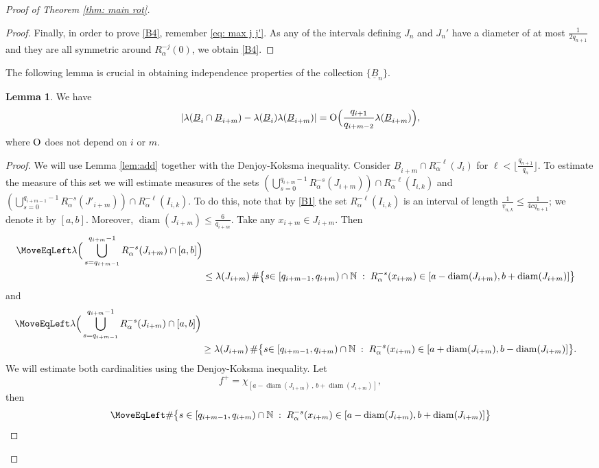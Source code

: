 \documentclass[11pt]{amsart}
\theoremstyle{definition}
\newtheorem{lemma}[definition]{Lemma}
\numberwithin{equation}{section}
\def\N{\mathbb{N}}
\DeclareMathOperator{\diam}{diam}
\begin{document}
\begin{proof}[Proof of Theorem \ref{thm: main rot}]
\begin{proof}
Finally, in order to prove \ref{B4}, remember \eqref{eq: max j j'}.
As any of the intervals defining $J_n$ and $J_n'$ have a diameter of at most $\frac{1}{2q_{n+1}}$ and they are all symmetric around $R_{\alpha}^{-j}(0)$, we obtain \ref{B4}. 
\end{proof}
The following lemma is crucial in obtaining independence properties of the collection $\{\underline{B}_n\}$.
\begin{lemma}\label{lem:add2} We have 
$$
|\lambda(\underline{B}_i\cap \underline{B}_{i+m})- \lambda(\underline{B}_i)\lambda(\underline{B}_{i+m})|={\rm O}\Big(\frac{q_{i+1}}{q_{i+m-2}}\lambda(\underline{B}_{i+m})\Big),
$$
where $\rm O$ does not depend on $i$ or $m$.
\end{lemma}
\begin{proof}
 We will use Lemma \ref{lem:add} together with the Denjoy-Koksma inequality. Consider $\underline{B}_{i+m}\cap R_\alpha^{-\ell}(J_i)$ for 
$\ell< \lfloor \frac{q_{n+1}}{q_n}\rfloor$. To estimate the measure of this set we  will estimate measures of the sets 
$(\bigcup_{s=0}^{q_{i+m}-1}R^{-s}_\alpha(J_{i+m}))\cap R_{\alpha}^{-\ell} (I_{i,k})$ and  $(\bigcup_{s=0}^{q_{i+m-1}-1}R^{-s}_\alpha(J'_{i+m}))\cap R_{\alpha}^{-\ell} (I_{i,k})$. To do this, note that by \ref{B1} the set $R_{\alpha}^{-\ell} (I_{i,k})$ is an interval of length $\frac{1}{\underline{v}_{n,k}}\leq \frac{1}{4cq_{n+1}}$;
we denote it by $[a,b]$. 
Moreover, $\diam(J_{i+m})\leq \frac{6}{q_{i+m}}$. Take any $x_{i+m}\in J_{i+m}$. Then 
\begin{align*}
 \MoveEqLeft\lambda\Big(\bigcup_{ s=q_{i+m-1}}^{q_{i+m}-1}R^{-s}_\alpha(J_{i+m})\cap [a,b]\Big)\\
 &\leq \lambda(J_{i+m})\, \#\big\{s { \in [q_{i+m-1},q_{i+m})\cap\N}\;:\; R^{-s}_\alpha(x_{i+m})\in [a- \diam(J_{i+m}),b+\diam(J_{i+m})]\big\} 
\end{align*}
and 
\begin{align*}
 \MoveEqLeft\lambda\Big(\bigcup_{s=q_{i+m-1}}^{q_{i+m}-1}R^{-s}_\alpha(J_{i+m})\cap [a,b]\Big)\\
 &\geq \lambda(J_{i+m})\, \#\big\{s{ \in [q_{i+m-1},q_{i+m})\cap\N}\;:\; R^{-s}_\alpha(x_{i+m})\in [a+ \diam(J_{i+m}),b-\diam(J_{i+m})]\big\}.
\end{align*}
We will estimate both cardinalities using the Denjoy-Koksma inequality. Let 
$$f^+=\chi_{[a- \diam(J_{i+m})\,,\,b+\diam(J_{i+m})]},$$ 
then 
\begin{align*}
 \MoveEqLeft\#\big\{s  \in [q_{i+m-1},q_{i+m})\cap\N\;:\; R^{-s}_\alpha(x_{i+m})\in [a- \diam(J_{i+m}),b+\diam(J_{i+m})]\big\}\\

\end{align*}
\end{proof}
\end{proof}
\end{document}
